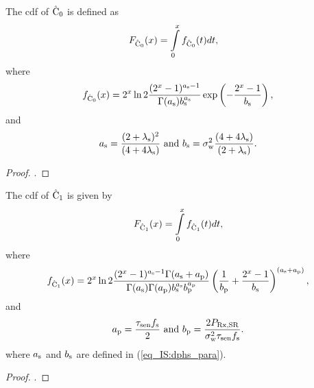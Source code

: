 \begin{lemma} \label{lm_IS:lem2}
\normalfont
The cdf of $\hat{\text{C}}_{\text{0}}$ is defined as
\begin{align}
\fcz(x) &= \int\limits_{0}^{x} \dcz(t) dt, \label{eq_IS:dis_C0} 
\end{align}
where
\begin{align}
\dcz(x) = 2^x \ln 2 \frac{(2^x - 1)^{\as - 1}}{\Gamma(\as) \bs^{\as}} \exp\left(-\frac{2^x - 1}{\bs}\right),  \label{eq_IS:den_C0}
\end{align}
and 
\begin{align}
\as = \frac{(2 + \ls)^2}{(4 + 4\ls)} \text{ and }  \bs = \npo \frac{(4 + 4\ls)}{(2 + \ls)} \label{eq_IS:dphs_para}. 
\end{align}
\end{lemma}
\begin{proof}
.
\end{proof}

\begin{lemma} \label{lm_IS:lem3}
\normalfont
The cdf of $\hat{\text{C}}_{\text{1}}$ is given by
\begin{align}
\fco(x) = \int\limits_{0}^{x} \dco(t) dt, \label{eq_IS:dis_C1} 
\end{align}
where
\begin{align}
\dco(x) = 2^x \ln 2 \frac{(2^x - 1)^{\as - 1} \Gamma(\as + \ap)}{\Gamma(\as) \Gamma(\ap) \bs^{\as} \bp^{\ap}} \left(\frac{1}{\bp} + \frac{2^x - 1}{\bs}\right)^{(\as + \ap)}, \label{eq_IS:den_C1}
\end{align}
and
\begin{align}
a_{\text{p}} = \frac{\tau_{\text{sen}} f_{\text{s}}}{2} \text{ and } b_{\text{p}} = \frac{2 P_{\text{Rx,SR}}}{\sigma^2_{\text{w}} \tau_{\text{sen}}f_{\text{s}}}.
\end{align}
where $a_{\text{s}}$ and $b_{\text{s}}$ are defined in (\ref{eq_IS:dphs_para}).%
\end{lemma}
\begin{proof}
.
\end{proof}

